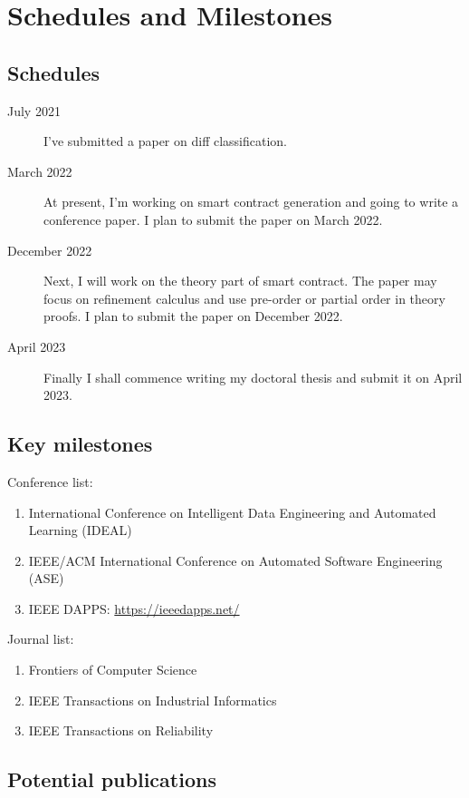 \chapter{Schedules and Milestones}

\section{Schedules}


\begin{description}
   \item[July 2021]  I've submitted a paper on diff classification.
   \item[March 2022] At present, I'm working on smart contract generation and going to write a conference paper. I plan to submit the paper on March 2022.
   \item[December 2022]  Next, I will work on the theory part of smart contract. The paper may focus on refinement calculus and use pre-order or partial order in theory proofs. I plan to submit the paper on December 2022.
   \item[April 2023] Finally I shall commence writing my doctoral thesis and submit it on April 2023.
\end{description}


\section{Key milestones}

Conference list:
\begin{enumerate}
\item International Conference on Intelligent Data Engineering and Automated Learning (IDEAL)
\item IEEE/ACM International Conference on Automated Software Engineering (ASE)
\item IEEE DAPPS: \url{https://ieeedapps.net/}
\end{enumerate}

Journal list:
\begin{enumerate}
\item Frontiers of Computer Science
\item IEEE Transactions on Industrial Informatics
\item IEEE Transactions on Reliability
\end{enumerate}

\section{Potential publications}

